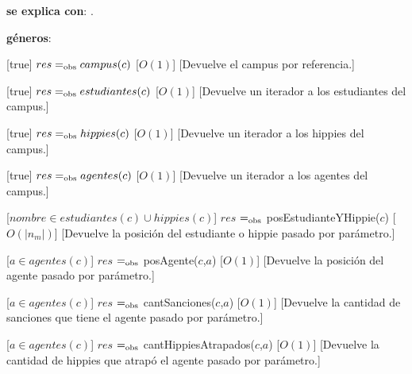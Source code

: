 \begin{Interfaz}

	\textbf{se explica con}: .\par
	\textbf{géneros}: 
	


   [true]
   {$res =_{\mathrm{obs}} campus(c)$}
   [$O(1)$]
   [Devuelve el campus por referencia.]

   [true]
   {$res =_{\mathrm{obs}} estudiantes(c)$}
   [$O(1)$]
   [Devuelve un iterador a los estudiantes del campus.]\par
   [true]
   {$res =_{\mathrm{obs}} hippies(c)$}
   [$O(1)$]
   [Devuelve un iterador a los hippies del campus.]
  
   [true]
   {$res =_{\mathrm{obs}} agentes(c)$}
   [$O(1)$]
   [Devuelve un iterador a los agentes del campus.]

   [$nombre \in estudiantes(c) \cup hippies(c) $]
   {$res$ $=_{\mathrm{obs}}$ posEstudianteYHippie($c$)}
   [$O(|n_{m}|)$]
   [Devuelve la posici\'on del estudiante o hippie pasado por parámetro.]

   [$a \in agentes(c)$]
   {$res$ $=_{\mathrm{obs}}$ posAgente($c$,$a$)}
   [$O(1)$]
   [Devuelve la posici\'on del agente pasado por parámetro.]

   [$a \in agentes(c)$]
   {$res$ $=_{\mathrm{obs}}$ cantSanciones($c$,$a$)}
   [$O(1)$]
   [Devuelve la cantidad de sanciones que tiene el agente pasado por parámetro.]

   [$a \in agentes(c)$]
   {$res$ $=_{\mathrm{obs}}$ cantHippiesAtrapados($c$,$a$)}
   [$O(1)$]
   [Devuelve la cantidad de hippies que atrap\'o el agente pasado por parámetro.]



\end{Interfaz}
